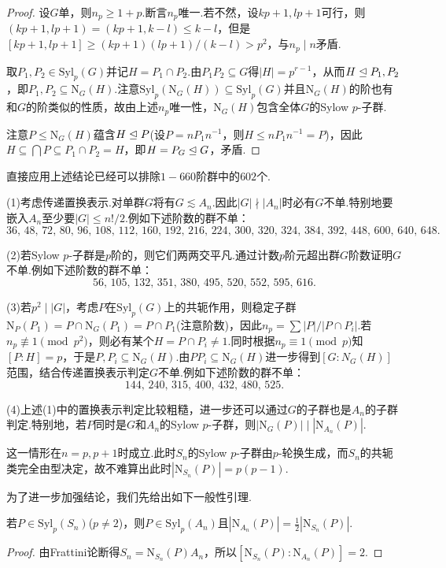 \begin{proof}
	设$G$单，则$n_p\ge 1+p$.断言$n_p$唯一.若不然，设$kp+1,lp+1$可行，则$(kp+1,lp+1)=(kp+1,k-l)\le k-l$，但是$[kp+1,lp+1]\ge(kp+1)(lp+1)/(k-l)>p^2$，与$n_p\mid n$矛盾.

	取$P_1,P_2\in\mathrm{Syl}_p(G)$并记$H=P_1\cap P_2$.由$P_1P_2\subseteq G$得$|H|=p^{r-1}$，从而$H\trianglelefteq P_1,P_2$，即$P_1,P_2\subseteq\mathrm{N}_G(H)$.注意$\mathrm{Syl}_p(\mathrm{N}_G(H))\subseteq\mathrm{Syl}_p(G)$并且$\mathrm{N}_G(H)$的阶也有和$G$的阶类似的性质，故由上述$n_p$唯一性，$\mathrm{N}_G(H)$包含全体$G$的Sylow $p$-子群.

	注意$P\le\mathrm{N}_G(H)$蕴含$H\trianglelefteq P$(设$P=nP_1n^{-1}$，则$H\le nP_1n^{-1}=P$)，因此$H\subseteq\bigcap P\subseteq P_1\cap P_2=H$，即$H=P_G\trianglelefteq G$，矛盾.
\end{proof}

直接应用上述结论已经可以排除$1-660$阶群中的$602$个.

(1)考虑传递置换表示.对单群$G$将有$G\lesssim A_n$.因此$|G|\nmid |A_n|$时必有$G$不单.特别地要嵌入$A_n$至少要$|G|\le n!/2$.例如下述阶数的群不单：
\[
	36,\,48,\,72,\,80,\,96,\,108,\,112,\,160,\,192,\,216,\,224,\,300,\,320,\,324,\,384,\,392,\,448,\,600,\,640,\,648.
\]

(2)若Sylow $p$-子群是$p$阶的，则它们两两交平凡.通过计数$p$阶元超出群$G$阶数证明$G$不单.例如下述阶数的群不单：
\[
	56,\,105,\,132,\,351,\,380,\,495,\,520,\,552,\,595,\,616.
\]

(3)若$p^2\mid|G|$，考虑$P$在$\mathrm{Syl}_p(G)$上的共轭作用，则稳定子群$\mathrm{N}_P(P_1)=P\cap\mathrm{N}_G(P_1)=P\cap P_1$(注意阶数)，因此$n_p=\sum|P|/|P\cap P_i|$.若$n_p\not\equiv 1\pmod{p^2}$，则必有某个$H=P\cap P_i\ne 1$.同时根据$n_p\equiv 1\pmod p$知$[P:H]=p$，于是$P,P_i\subseteq\mathrm{N}_G(H)$.由$PP_i\subseteq\mathrm{N}_G(H)$进一步得到$[G:N_G(H)]$范围，结合传递置换表示判定$G$不单.例如下述阶数的群不单：
\[
	144,\,240,\,315,\,400,\,432,\,480,\,525.
\]

(4)上述(1)中的置换表示判定比较粗糙，进一步还可以通过$G$的子群也是$A_n$的子群判定.特别地，若$P$同时是$G$和$A_n$的Sylow $p$-子群，则$|\mathrm{N}_G(P)|\mid|\mathrm{N}_{A_n}(P)|$.

这一情形在$n=p,p+1$时成立.此时$S_n$的Sylow $p$-子群由$p$-轮换生成，而$S_n$的共轭类完全由型决定，故不难算出此时$|\mathrm{N}_{S_n}(P)|=p(p-1)$.

为了进一步加强结论，我们先给出如下一般性引理.
\begin{lemma*}
	若$P\in\mathrm{Syl}_p(S_n)$($p\ne 2$)，则$P\in\mathrm{Syl}_p(A_n)$且$|\mathrm{N}_{A_n}(P)|=\frac{1}{2}|\mathrm{N}_{S_n}(P)|$.
\end{lemma*}
\begin{proof}
	由Frattini论断得$S_n=\mathrm{N}_{S_n}(P)A_n$，所以$[\mathrm{N}_{S_n}(P):\mathrm{N}_{A_n}(P)]=2$.
\end{proof}

